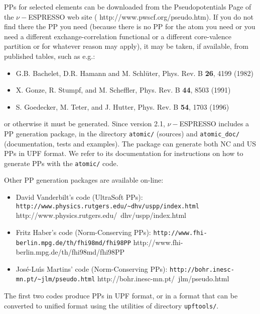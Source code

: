 \documentclass[12pt,a4paper]{article}
\begin{document}
PPs for selected elements can be downloaded from the Pseudopotentials
Page of the $\nu-$ESPRESSO web site
(%
                   {http://www.pwscf.org/pseudo.htm}).
If you do not find there the PP you need (because there is no PP for
the atom you need or you need a different exchange-correlation
functional or a different core-valence partition or for whatever
reason may apply), it may be taken, if available, from published
tables, such as e.g.:
\begin{itemize}
  \item G.B. Bachelet, D.R. Hamann and M. Schl\"uter, Phys. Rev. B
        \textbf{26}, 4199 (1982)
  \item X. Gonze, R. Stumpf, and M. Scheffler, Phys. Rev. B
        \textbf{44}, 8503 (1991)
  \item S. Goedecker, M. Teter, and J. Hutter, Phys. Rev. B
        \textbf{54}, 1703 (1996)
\end{itemize}
or otherwise it must be generated. Since version 2.1, $\nu-$ESPRESSO 
includes a PP generation package, in the
directory \texttt{atomic/} (sources) and \texttt{atomic\_doc/}
(documentation, tests and examples). 
The package can generate both NC and US PPs in UPF format.
We refer to its documentation for instructions on how to generate PPs
with the \texttt{atomic/} code.

Other PP generation packages are available on-line:

\begin{itemize}
  \item
    David Vanderbilt's code (UltraSoft PPs):\hfill\break
    \htmladdnormallink%
    {\texttt{http://www.physics.rutgers.edu/\~{}dhv/uspp/index.html}}%
    {http://www.physics.rutgers.edu/~dhv/uspp/index.html}
  \item
    Fritz Haber's code (Norm-Conserving PPs):\hfill\break
    \htmladdnormallink%
    {\texttt{http://www.fhi-berlin.mpg.de/th/fhi98md/fhi98PP}}%
    {http://www.fhi-berlin.mpg.de/th/fhi98md/fhi98PP}
  \item
    Jos\'e-Lu\'\i{}s Martins' code (Norm-Conserving PPs):\hfill\break
    \htmladdnormallink%
    {\texttt{http://bohr.inesc-mn.pt/\~{}jlm/pseudo.html}}%
    {http://bohr.inesc-mn.pt/~jlm/pseudo.html}
\end{itemize}

The first two codes produce PPs in UPF format, or in a format that
can be converted to unified format using the utilities of directory
\texttt{upftools/}.
\end{document}
